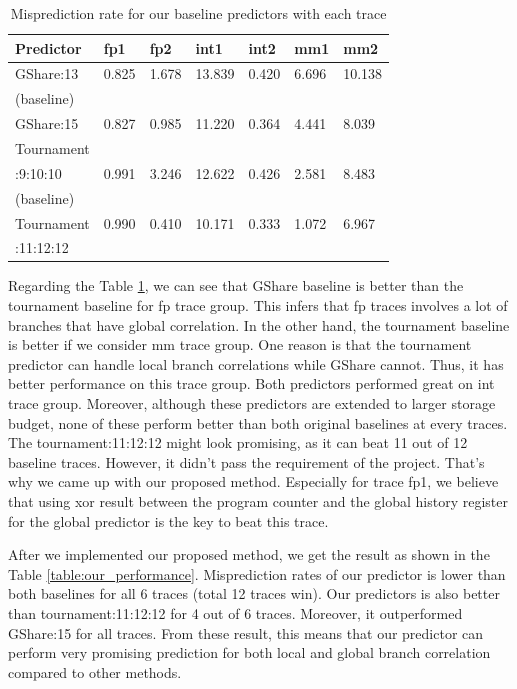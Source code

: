 \documentclass[conference]{IEEEtran}
\begin{document}
\begin{scriptsize}
\begin{table}[h!]
  \centering
  \caption{Misprediction rate for our baseline predictors with each trace}
  \label{table:baseline_performance}
  \begin{tabular}{|l|l|l|l|l|l|l|}
    \hline
    \textbf{Predictor} & \textbf{fp1} & \textbf{fp2} & \textbf{int1} &\textbf{int2} & \textbf{mm1} & \textbf{mm2}\\
    \hline
    \hline
    GShare:13 & 0.825 & 1.678 & 13.839 & 0.420 & 6.696 & 10.138 \\
    (baseline) & & & & & & \\
    \hline
    GShare:15 & 0.827 & 0.985 & 11.220 & 0.364 & 4.441 & 8.039 \\
    \hline
    Tournament & & & & & & \\
    :9:10:10 & 0.991 & 3.246 & 12.622 & 0.426 & 2.581 & 8.483 \\
    (baseline) & & & & & & \\
    \hline
    Tournament & 0.990 & 0.410 & 10.171 & 0.333 & 1.072 & 6.967 \\
    :11:12:12 & & & & & & \\
    \hline
  \end{tabular}
\end{table}
\end{scriptsize}

Regarding the Table \ref{table:baseline_performance}, we can see that GShare baseline is better than
the tournament baseline for fp trace group. This infers that fp traces involves a lot of branches that have
global correlation. In the other hand, the tournament
baseline is better if we consider mm trace group. One reason is that the tournament predictor can handle
local branch correlations while GShare cannot. Thus, it has better performance on this trace group.
Both predictors performed
great on int trace group. Moreover, although these predictors are extended
to larger storage budget, none of these perform better than both original baselines
at every traces. The tournament:11:12:12 might look promising, as it can beat 11 out of 12
baseline traces. However, it didn't pass the requirement of the project. That's why we came up
with our proposed method. Especially for trace fp1, we believe that using xor result
between the program counter and the global history register for the global predictor
is the key to beat this trace.

After we implemented our proposed method, we get the result as shown in the Table \ref{table:our_performance}.
Misprediction rates of our predictor is lower than both baselines for all 6 traces (total 12 traces win).
Our predictors is also better than tournament:11:12:12 for 4 out of 6 traces. Moreover,
it outperformed GShare:15 for all traces. From these result, this means that our predictor
can perform very promising prediction for both local and global branch correlation compared
to other methods.
\end{document}
